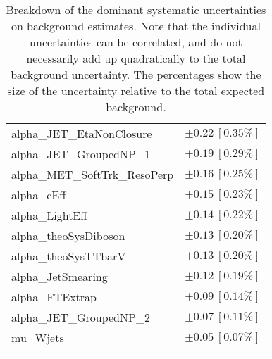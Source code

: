 \begin{table}
\begin{center}
\begin{tabular*}{\textwidth}{@{\extracolsep{\fill}}lc}
alpha\_JET\_EtaNonClosure         & $\pm 0.22\ [0.35\%] $       \\
alpha\_JET\_GroupedNP\_1         & $\pm 0.19\ [0.29\%] $       \\
alpha\_MET\_SoftTrk\_ResoPerp         & $\pm 0.16\ [0.25\%] $       \\
alpha\_cEff         & $\pm 0.15\ [0.23\%] $       \\
alpha\_LightEff         & $\pm 0.14\ [0.22\%] $       \\
alpha\_theoSysDiboson         & $\pm 0.13\ [0.20\%] $       \\
alpha\_theoSysTTbarV         & $\pm 0.13\ [0.20\%] $       \\
alpha\_JetSmearing         & $\pm 0.12\ [0.19\%] $       \\
alpha\_FTExtrap         & $\pm 0.09\ [0.14\%] $       \\
alpha\_JET\_GroupedNP\_2         & $\pm 0.07\ [0.11\%] $       \\
mu\_Wjets         & $\pm 0.05\ [0.07\%] $       \\
\noalign{\smallskip}\hline\noalign{\smallskip}
\end{tabular*}
\end{center}
\caption[Breakdown of uncertainty on background estimates]{
Breakdown of the dominant systematic uncertainties on background estimates.
Note that the individual uncertainties can be correlated, and do not necessarily add up quadratically to 
the total background uncertainty. The percentages show the size of the uncertainty relative to the total expected background.
\label{table.results.bkgestimate.uncertainties.VRTopATW}}
\end{table}
%